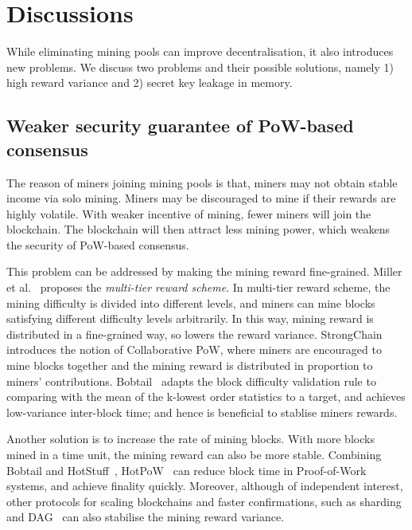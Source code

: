 \section{Discussions}
\label{sec:discussions}

While eliminating mining pools can improve decentralisation, it also introduces new problems.
We discuss two problems and their possible solutions, namely 1) high reward variance and 2) secret key leakage in memory.

\subsection{Weaker security guarantee of PoW-based consensus}

The reason of miners joining mining pools is that, miners may not obtain stable income via solo mining.
Miners may be discouraged to mine if their rewards are highly volatile.
With weaker incentive of mining, fewer miners will join the blockchain.
The blockchain will then attract less mining power, which weakens the security of PoW-based consensus.

This problem can be addressed by making the mining reward fine-grained.
Miller et al.~\cite{miller2015nonoutsourceable} proposes the \emph{multi-tier reward scheme}.
In multi-tier reward scheme, the mining difficulty is divided into different levels, and miners can mine blocks satisfying different difficulty levels arbitrarily.
In this way, mining reward is distributed in a fine-grained way, so lowers the reward variance.
StrongChain~\cite{szalachowski2019strongchain} introduces the notion of Collaborative PoW, where miners are encouraged to mine blocks together and the mining reward is distributed in proportion to miners' contributions.
Bobtail~\cite{bissias2017bobtail} adapts the block difficulty validation rule to comparing with the mean of the k-lowest order statistics to a target, and achieves low-variance inter-block time; and hence is beneficial to stablise miners rewards.

Another solution is to increase the rate of mining blocks.
With more blocks mined in a time unit, the mining reward can also be more stable.
Combining Bobtail and HotStuff~\cite{yin2019hotstuff}, HotPoW~\cite{keller2019hotpow} can reduce block time in Proof-of-Work systems, and achieve finality quickly.
Moreover, although of independent interest, other protocols for scaling blockchains and faster confirmations, such as sharding~\cite{wang2019monoxide} and DAG~\cite{li2018scaling} can also stabilise the mining reward variance.




